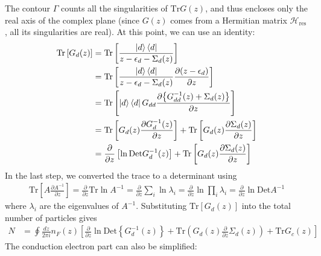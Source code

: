 \documentclass[twoside,11pt]{report}
\numberwithin{equation}{section}
\begin{document}
The contour \(\Gamma\) counts all the singularities of \(\text{Tr} G(z)\), and thus encloses only the real axis of the complex plane (since \(G(z)\) comes from a Hermitian matrix \(\mathcal{H}_\text{res}\), all its singularities are real).
At this point, we can use an identity:
\begin{equation}\begin{aligned}
	\text{Tr}\left[G_{d}(z)\right] &= \text{Tr}\left[ \frac{\ket{d}\bra{d}}{z - \epsilon_d - \Sigma_d(z)}\right]\\
				       &= \text{Tr}\left[ \frac{\ket{d}\bra{d}}{z - \epsilon_d - \Sigma_d(z)}\frac{\partial{\left(z - \epsilon_d\right)}}{\partial{z}} \right]\\
				       &= \text{Tr}\left[ \ket{d}\bra{d}G_{dd}\frac{\partial{\left\{G_{dd}^{-1}(z) + \Sigma_d(z)\right\}}}{\partial{z}} \right]\\
				       &= \text{Tr}\left[ G_{d}(z)\frac{\partial{G_{d}^{-1}(z)}}{\partial{z}} \right] + \text{Tr}\left[ G_{d}(z)\frac{\partial{\Sigma_d(z)}}{\partial{z}} \right]\\
				       &= \frac{\partial{}}{\partial{z}}\left[\ln \text{Det}G_{d}^{-1}(z)\right] + \text{Tr}\left[ G_{d}(z)\frac{\partial{\Sigma_d(z)}}{\partial{z}} \right]\\
\end{aligned}\end{equation}
In the last step, we converted the trace to a determinant using
\begin{equation}\begin{aligned}
	\text{Tr}\left[A \frac{\partial{A^{-1}}}{\partial{z}}\right] = \frac{\partial{}}{\partial{z}}\text{Tr}\ln A^{-1} =\frac{\partial{}}{\partial{z}}\sum_i \ln \lambda_i = \frac{\partial{}}{\partial{z}}\ln \prod_i \lambda_i = \frac{\partial{}}{\partial{z}}\ln \text{Det}A^{-1}
\end{aligned}\end{equation}
where \(\lambda_i\) are the eigenvalues of \(A^{-1}\). Substituting \(\text{Tr}\left[G_d(z)\right] \) into the total number of particles gives
\begin{equation}\begin{aligned}
	N  &= \oint \frac{dz}{2\pi i}n_F(z) \left[\frac{\partial{}}{\partial{z}} \ln \text{Det} \left\{G^{-1}_d(z)\right\} + \text{Tr} \left( G_d(z) \frac{\partial{}}{\partial{z}}\Sigma_d(z) \right) + \text{Tr}G_c(z)\right]
\end{aligned}\end{equation}
The conduction electron part can also be simplified:
\end{document}
